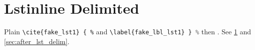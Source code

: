 \documentclass{article}
\begin{document}
\section{Lstinline Delimited}\label{sec:lst_delim}
Plain \lstinline|\cite{fake_lst1} { %| and \lstinline[language=Python]+\label{fake_lbl_lst1} } %+ then \cite{k1} \label{sec:after_lst_delim}.
See \ref{sec:lst_delim} and \ref{sec:after_lst_delim}.


\end{document}
